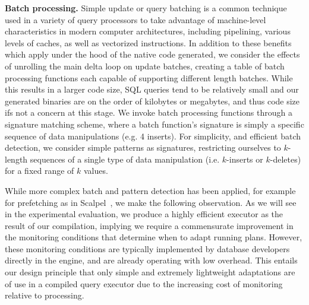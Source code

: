 \textbf{Batch processing.} 
Simple update or query batching is a common technique used in a variety of query
processors to take advantage of machine-level characteristics in modern computer
architectures, including pipelining, various levels of caches, as well as
vectorized instructions. In addition to these benefits which apply under the hood
of the native code generated, we consider the effects of unrolling the main delta
loop on update batches, creating a table of batch processing functions each
capable of supporting different length batches. While this results in a larger
code size, SQL queries tend to be relatively small and our generated binaries are
on the order of kilobytes or megabytes, and thus code size ifs not a concern at
this stage. We invoke batch processing functions through a signature matching
scheme, where a batch function's signature is simply a specific sequence of data
manipulations (e.g. 4 inserts). For simplicity, and efficient batch detection, we
consider simple patterns as signatures, restricting ourselves to $k$-length
sequences of a single type of data manipulation (i.e. $k$-inserts or $k$-deletes)
for a fixed range of $k$ values.

While more complex batch and pattern detection has been applied, for example for
prefetching as in Scalpel~\cite{bowman-tods:05}, we make the following
observation. As we will see in the experimental evaluation, we produce a highly
efficient executor as the result of our compilation, implying we require a
commensurate improvement in the monitoring conditions that determine when to
adapt running plans. However, these monitoring conditions are typically
implemented by database developers directly in the engine, and are already
operating with low overhead. This entails our design principle that only simple
and extremely lightweight adaptations are of use in a compiled query executor due
to the increasing cost of monitoring relative to processing.

